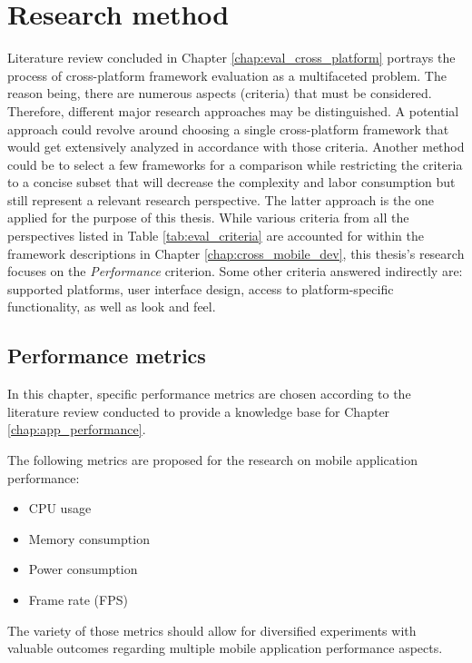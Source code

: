 
\chapter{Research method}

Literature review concluded in Chapter \ref{chap:eval_cross_platform} portrays the process of cross-platform framework evaluation as a multifaceted problem. The reason being, there are numerous aspects (criteria) that must be considered. Therefore, different major research approaches may be distinguished. A potential approach could revolve around choosing a single cross-platform framework that would get extensively analyzed in accordance with those criteria. Another method could be to select a few frameworks for a comparison while restricting the criteria to a concise subset that will decrease the complexity and labor consumption but still represent a relevant research perspective. The latter approach is the one applied for the purpose of this thesis. While various criteria from all the perspectives listed in Table \ref{tab:eval_criteria} are accounted for within the framework descriptions in Chapter \ref{chap:cross_mobile_dev}, this thesis's research focuses on the \emph{Performance} criterion. Some other criteria answered indirectly are: supported platforms, user interface design, access to platform-specific functionality, as well as look and feel.

\section{Performance metrics}\label{chap:performance_metrics}

In this chapter, specific performance metrics are chosen according to the literature review conducted to provide a knowledge base for Chapter \ref{chap:app_performance}.

\bigskip

The following metrics are proposed for the research on mobile application performance:
\begin{itemize}
    \item CPU usage
    \item Memory consumption
    \item Power consumption
    \item Frame rate (FPS)
\end{itemize}

The variety of those metrics should allow for diversified experiments with valuable outcomes regarding multiple mobile application performance aspects.

